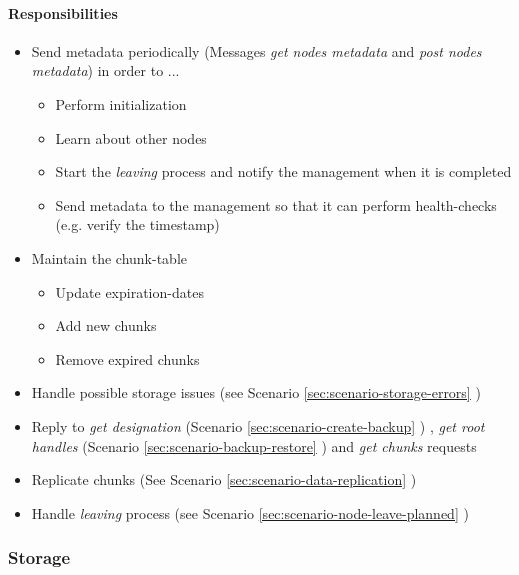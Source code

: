 \paragraph{Responsibilities}

\begin{itemize}
    \item Send \gls{metadata} periodically (Messages \emph{get nodes metadata} and \emph{post nodes metadata}) in order to ...
    \begin{itemize}
        \item Perform initialization
        \item Learn about other \glspl{node}
        \item Start the \emph{leaving} process and notify the \gls{management} when it is completed
        \item Send \gls{metadata} to the \gls{management} so that it can perform health-checks (e.g. verify the timestamp)
    \end{itemize}
    \item Maintain the \gls{chunk-table}
    \begin{itemize}
        \item Update \glspl{expiration-date}
        \item Add new \glspl{chunk}
        \item Remove expired \glspl{chunk}
    \end{itemize}
    \item Handle possible \gls{storage} issues (see Scenario \ref{sec:scenario-storage-errors} )
    \item Reply to \emph{get designation}  (Scenario \ref{sec:scenario-create-backup} ) , \emph{get root handles} (Scenario \ref{sec:scenario-backup-restore} ) and \emph{get chunks} requests
    \item Replicate \glspl{chunk} (See Scenario \ref{sec:scenario-data-replication} )
    \item Handle \emph{leaving} process (see Scenario \ref{sec:scenario-node-leave-planned} )
\end{itemize}

\label{sec:component-storage}
\subsubsection{Storage}

